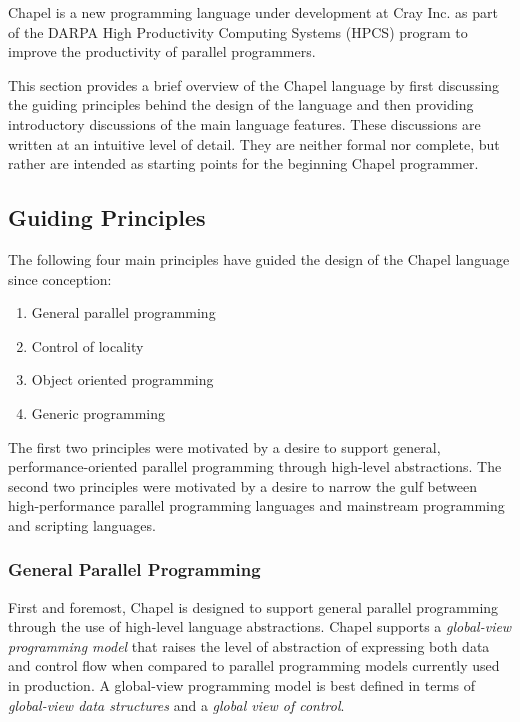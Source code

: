 \label{Language_Overview}

Chapel is a new programming language under development at Cray Inc. as
part of the DARPA High Productivity Computing Systems (HPCS) program
to improve the productivity of parallel programmers.

This section provides a brief overview of the Chapel language by first
discussing the guiding principles behind the design of the language
and then providing introductory discussions of the main language
features.  These discussions are written at an intuitive level of
detail.  They are neither formal nor complete, but rather are intended
as starting points for the beginning Chapel programmer.

\subsection{Guiding Principles}

The following four main principles have guided the design of the
Chapel language since conception:
\begin{enumerate}
\item General parallel programming
\item Control of locality
\item Object oriented programming
\item Generic programming
\end{enumerate}
The first two principles were motivated by a desire to support
general, performance-oriented parallel programming through high-level
abstractions.  The second two principles were motivated by a desire to
narrow the gulf between high-performance parallel programming
languages and mainstream programming and scripting languages.

\subsubsection{General Parallel Programming}

First and foremost, Chapel is designed to support general parallel
programming through the use of high-level language abstractions.
Chapel supports a \emph{global-view programming model} that raises the
level of abstraction of expressing both data and control flow when
compared to parallel programming models currently used in production.
A global-view programming model is best defined in terms
of \emph{global-view data structures} and a \emph{global view of
control}.


